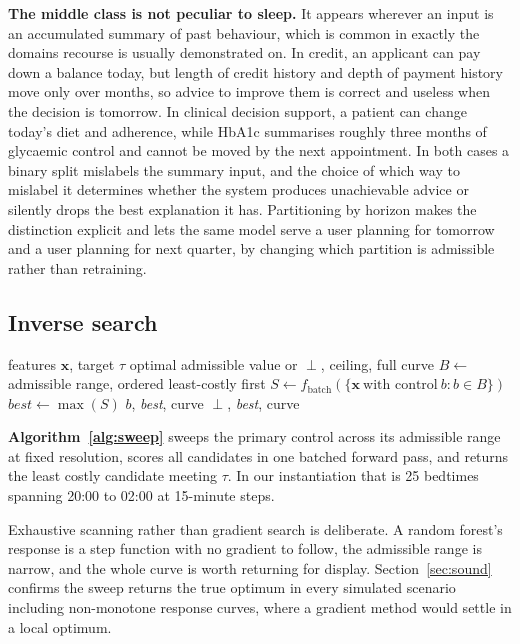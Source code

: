 \documentclass[conference]{IEEEtran}
\begin{document}
\textbf{The middle class is not peculiar to sleep.} It appears wherever an input
is an accumulated summary of past behaviour, which is common in exactly the
domains recourse is usually demonstrated on. In credit, an applicant can pay
down a balance today, but length of credit history and depth of payment history
move only over months, so advice to improve them is correct and useless when the
decision is tomorrow. In clinical decision support, a patient can change today's
diet and adherence, while HbA1c summarises roughly three months of glycaemic
control and cannot be moved by the next appointment. In both cases a binary
split mislabels the summary input, and the choice of which way to mislabel it
determines whether the system produces unachievable advice or silently drops the
best explanation it has. Partitioning by horizon makes the distinction explicit
and lets the same model serve a user planning for tomorrow and a user planning
for next quarter, by changing which partition is admissible rather than
retraining.

\subsection{Inverse search}

\begin{algorithm}[t]
\caption{Primary-control sweep}
\label{alg:sweep}
\begin{algorithmic}[1]
\Require features $\mathbf{x}$, target $\tau$
\Ensure optimal admissible value or $\perp$, ceiling, full curve
\State $B \gets$ admissible range, ordered least-costly first
\State $S \gets f_{\text{batch}}(\{\mathbf{x}\ \text{with control}\ b : b \in B\})$
\State $\textit{best} \gets \max(S)$
   \Return $b$, \textit{best}, curve 
  \EndIf
\EndFor
\State \Return $\perp$, \textit{best}, curve
\end{algorithmic}
\end{algorithm}

\textbf{Algorithm~\ref{alg:sweep}} sweeps the primary control across its
admissible range at fixed resolution, scores all candidates in one batched
forward pass, and returns the least costly candidate meeting $\tau$. In our
instantiation that is 25 bedtimes spanning 20:00 to 02:00 at 15-minute steps.

Exhaustive scanning rather than gradient search is deliberate. A random forest's
response is a step function with no gradient to follow, the admissible range is
narrow, and the whole curve is worth returning for display.
Section~\ref{sec:sound} confirms the sweep returns the true optimum in every
simulated scenario including non-monotone response curves, where a gradient
method would settle in a local optimum.
\end{document}
